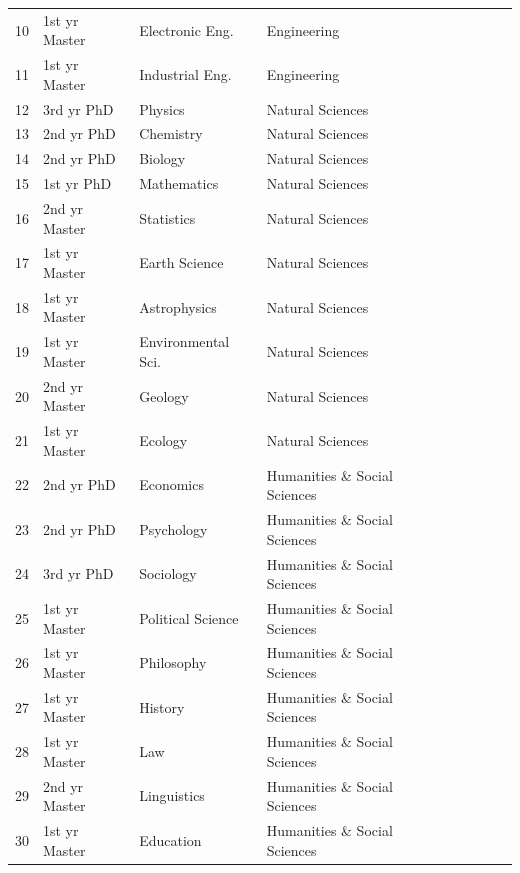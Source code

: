 \documentclass{llmxive}
\providecommand{\cmark}{\ding{51}}
\begin{document}
\begin{table}[h]
{\begin{tabular}{c l l l c c c c c}
10 & 1st yr Master & Electronic Eng. & Engineering & & \cmark & \cmark & & \\
11 & 1st yr Master & Industrial Eng. & Engineering & \cmark & \cmark & & & \\
12 & 3rd yr PhD & Physics & Natural Sciences & \cmark & \cmark & \cmark & \cmark & \cmark \\
13 & 2nd yr PhD & Chemistry & Natural Sciences & \cmark & \cmark & \cmark & \cmark & \cmark \\
14 & 2nd yr PhD & Biology & Natural Sciences & & \cmark & \cmark & \cmark & \cmark \\
15 & 1st yr PhD & Mathematics & Natural Sciences & \cmark & \cmark & \cmark & & \\
16 & 2nd yr Master & Statistics & Natural Sciences & \cmark & \cmark & & & \cmark \\
17 & 1st yr Master & Earth Science & Natural Sciences & & \cmark & \cmark & & \\
18 & 1st yr Master & Astrophysics & Natural Sciences & & \cmark & \cmark & & \\
19 & 1st yr Master & Environmental Sci. & Natural Sciences & \cmark & \cmark & & & \\
20 & 2nd yr Master & Geology & Natural Sciences & \cmark & \cmark & & & \\
21 & 1st yr Master & Ecology & Natural Sciences & & \cmark & \cmark & & \\
22 & 2nd yr PhD & Economics & Humanities \& Social Sciences & \cmark & \cmark & \cmark & \cmark & \cmark \\
23 & 2nd yr PhD & Psychology & Humanities \& Social Sciences & \cmark & \cmark & \cmark & \cmark & \cmark \\
24 & 3rd yr PhD & Sociology & Humanities \& Social Sciences & & \cmark & & & \cmark \\
25 & 1st yr Master & Political Science & Humanities \& Social Sciences & \cmark & \cmark & & & \\
26 & 1st yr Master & Philosophy & Humanities \& Social Sciences & \cmark & \cmark & \cmark & & \cmark \\
27 & 1st yr Master & History & Humanities \& Social Sciences & \cmark & \cmark & \cmark & & \\
28 & 1st yr Master & Law & Humanities \& Social Sciences & \cmark & \cmark & & & \cmark \\
29 & 2nd yr Master & Linguistics & Humanities \& Social Sciences & & \cmark & & & \cmark \\
30 & 1st yr Master & Education & Humanities \& Social Sciences & & \cmark & \cmark & & \\

\end{tabular}}
\end{table}
\end{document}
